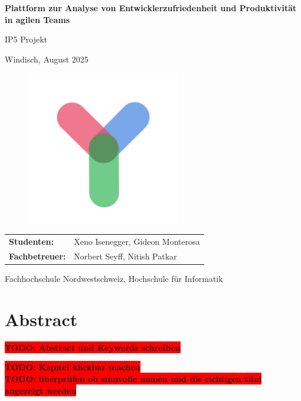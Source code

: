 \documentclass[12pt,a4paper]{report}
\newcommand{\todo}[1]{\colorbox{red}{\textbf{TODO: #1}}\\}
\begin{document}
\begin{titlepage}
  \centering
  {\huge \textbf{Plattform zur Analyse von Entwicklerzufriedenheit und Produktivität in agilen Teams} \par}
  {\large IP5 Projekt \par}
  \vspace{0.5cm}
  {Windisch, August 2025 \par}
  \vspace{0.5cm}

  \begin{figure}[H]
    \centering
    \includegraphics[width=0.60\textwidth]{../figures/logo.png}
  \end{figure}

  \vfill
  \begin{tabular}{@{}ll@{}}
    \textbf{Studenten:}    & Xeno Isenegger, Gideon Monterosa \\
    \textbf{Fachbetreuer:} & Norbert Seyff, Nitish Patkar
  \end{tabular}

  {Fachhochschule Nordwestschweiz, Hochschule für Informatik \par}
\end{titlepage}

\chapter*{Abstract}
\todo{Abstract und Keywords schreiben}
\newpage

\todo{Kapitel klickbar machen}
\todo{überprüfen ob sinnvolle namen und die richtigen titel angezeigt werden}
\tableofcontents
\newpage

\listoffigures
\newpage

\listoftables
\newpage
\end{document}
